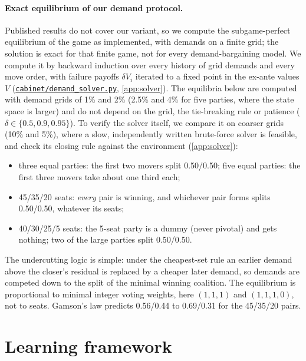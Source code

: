 \documentclass[11pt,a4paper]{article}
\newcommand{\repo}{https://github.com/bot2048/cabinet-bargaining-marl}
\newcommand{\code}[1]{\href{\repo/blob/main/#1}{\texttt{\small #1}}}
\begin{document}
\paragraph{Exact equilibrium of our demand protocol.} Published results do not cover our variant, so we
compute the subgame-perfect equilibrium of the game as implemented, with demands on a finite grid; the
solution is exact for that finite game, not for every demand-bargaining model. We compute it by backward induction over every history of grid demands and
every move order, with failure payoffs $\delta V_i$ iterated to a fixed point in the ex-ante values $V$
(\code{cabinet/demand\_solver.py}, \cref{app:solver}). The equilibria below are computed with demand grids of 1\% and 2\% (2.5\% and 4\% for five parties,
where the state space is larger) and do not depend on the grid, the tie-breaking rule or patience
($\delta\in\{0.5,0.9,0.95\}$). To verify the solver itself, we compare it on coarser grids (10\% and
5\%), where a slow, independently written brute-force solver is feasible, and check its closing rule
against the environment (\cref{app:solver}):
\begin{itemize}
\item three equal parties: the first two movers split 0.50/0.50; five equal parties: the first three
movers take about one third each;
\item 45/35/20 seats: \emph{every} pair is winning, and whichever pair forms splits 0.50/0.50, whatever
its seats;
\item 40/30/25/5 seats: the 5-seat party is a dummy (never pivotal) and gets nothing; two of the large
parties split 0.50/0.50.
\end{itemize}
The undercutting logic is simple: under the cheapest-set rule an earlier demand above the closer's
residual is replaced by a cheaper later demand, so demands are competed down to the split of the minimal
winning coalition. The equilibrium is proportional to minimal integer voting weights, here $(1,1,1)$ and
$(1,1,1,0)$, not to seats. Gamson's law predicts 0.56/0.44 to 0.69/0.31 for the 45/35/20 pairs.

\section{Learning framework}\label{sec:learning}
\end{document}

